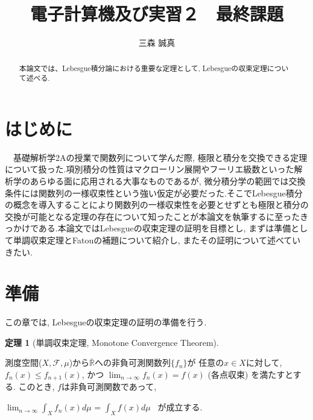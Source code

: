 \documentclass[12pt]{amsart}
\title{電子計算機及び実習２　最終課題}
\author{三森 誠真}
\theoremstyle{definiton}
\newtheorem{theorem}{定理}
\begin{document}
\begin{abstract}
本論文では、Lebesgue積分論における重要な定理として, Lebesgueの収束定理について述べる.
\end{abstract}

\maketitle

\section{はじめに}
　基礎解析学2Aの授業で関数列について学んだ際, 極限と積分を交換できる定理について扱った.項別積分の性質はマクローリン展開やフーリエ級数といった解析学のあらゆる面に応用される大事なものであるが, 微分積分学の範囲では交換条件には関数列の一様収束性という強い仮定が必要だった.そこでLebesgue積分の概念を導入することにより関数列の一様収束性を必要とせずとも極限と積分の交換が可能となる定理の存在について知ったことが本論文を執筆するに至ったきっかけである.本論文ではLebesgueの収束定理の証明を目標とし, まずは準備として単調収束定理とFatouの補題について紹介し, またその証明について述べていきたい.

\bigskip

\section{準備}
この章では, Lebesgueの収束定理の証明の準備を行う.

\begin{theorem}
[単調収束定理, Monotone Convergence Theorem]
\end{theorem}
測度空間($X, \mathcal{F}, \mu$)から$\overline{\mathbb{R}}$への非負可測関数列$\{f_n\}$が
任意の$x \in X$に対して, $f_n(x) \le f_{n+1} (x)$, かつ
$\displaystyle \lim_{n \to \infty} f_n(x) = f(x)$ (各点収束) を満たすとする. このとき, 
$f$は非負可測関数であって, 

$\displaystyle \lim_{n \to \infty} \displaystyle \int_X f_n(x) d\mu$ =
$\displaystyle \int_X f(x) d\mu$ \ が成立する.

\bigskip
\end{document}
